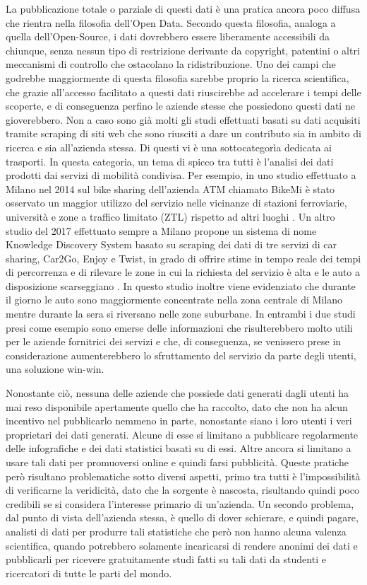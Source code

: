 La pubblicazione totale o parziale di questi dati è una pratica ancora poco diffusa che rientra nella filosofia dell'Open Data. Secondo questa filosofia, analoga a quella dell'Open-Source, i dati dovrebbero essere liberamente accessibili da chiunque, senza nessun tipo di restrizione derivante da copyright, patentini o altri meccanismi di controllo che ostacolano la ridistribuzione. Uno dei campi che godrebbe maggiormente di questa filosofia sarebbe proprio la ricerca scientifica, che grazie all'accesso facilitato a questi dati riuscirebbe ad accelerare i tempi delle scoperte, e di conseguenza perfino le aziende stesse che possiedono questi dati ne gioverebbero. Non a caso sono già molti gli studi effettuati basati su dati acquisiti tramite scraping di siti web che sono riusciti a dare un contributo sia in ambito di ricerca e sia all'azienda stessa. Di questi vi è una sottocategorìa dedicata ai trasporti. In questa categoria, un tema di spicco tra tutti è l'analisi dei dati prodotti dai servizi di mobilità condivisa. Per esempio, in uno studio effettuato a Milano nel 2014 sul bike sharing dell'azienda ATM chiamato BikeMi è stato osservato un maggior utilizzo del servizio nelle vicinanze di stazioni ferroviarie, università e zone a traffico limitato (ZTL) rispetto ad altri luoghi \cite{croci2014optimizing}. Un altro studio del 2017 effettuato sempre a Milano propone un sistema di nome Knowledge Discovery System basato su scraping dei dati di tre servizi di car sharing, Car2Go, Enjoy e Twist, in grado di offrire stime in tempo reale dei tempi di percorrenza e di rilevare le zone in cui la richiesta del servizio è alta e le auto a disposizione scarseggiano \cite{pagani2017knowledge}. In questo studio inoltre viene evidenziato che durante il giorno le auto sono maggiormente concentrate nella zona centrale di Milano mentre durante la sera si riversano nelle zone suburbane. In entrambi i due studi presi come esempio sono emerse delle informazioni che risulterebbero molto utili per le aziende fornitrici dei servizi e che, di conseguenza, se venissero prese in considerazione aumenterebbero lo sfruttamento del servizio da parte degli utenti, una soluzione win-win.

Nonostante ciò, nessuna delle aziende che possiede dati generati dagli utenti ha mai reso disponibile apertamente quello che ha raccolto, dato che non ha alcun incentivo nel pubblicarlo nemmeno in parte, nonostante siano i loro utenti i veri proprietari dei dati generati. Alcune di esse si limitano a pubblicare regolarmente delle infografiche e dei dati statistici basati su di essi. Altre ancora si limitano a usare tali dati per promuoversi online e quindi farsi pubblicità. Queste pratiche però risultano problematiche sotto diversi aspetti, primo tra tutti è l'impossibilità di verificarne la veridicità, dato che la sorgente è nascosta, risultando quindi poco credibili se si considera l'interesse primario di un'azienda. Un secondo problema, dal punto di vista dell'azienda stessa, è quello di dover schierare, e quindi pagare, analisti di dati per produrre tali statistiche che però non hanno alcuna valenza scientifica, quando potrebbero solamente incaricarsi di rendere anonimi dei dati e pubblicarli per ricevere gratuitamente studi fatti su tali dati da studenti e ricercatori di tutte le parti del mondo.

